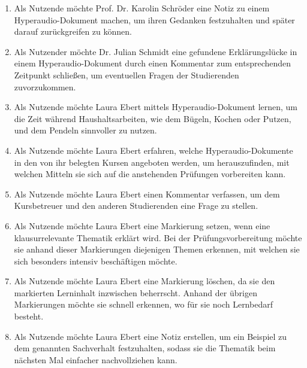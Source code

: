 \begin{enumerate}[label=US-\arabic*:,ref=US-\arabic*]
\item \label{US-Notiz-L} Als Nutzende möchte Prof. Dr. Karolin Schröder eine Notiz zu einem Hyperaudio-Dokument machen, um ihren Gedanken festzuhalten und später darauf zurückgreifen zu können.

\item \label{US-Kommentar-L} Als Nutzender möchte Dr. Julian Schmidt eine gefundene Erklärungslücke in einem Hyperaudio-Dokument durch einen Kommentar zum entsprechenden Zeitpunkt schließen, um eventuellen Fragen der Studierenden zuvorzukommen.


\item \label{US-Zeit} Als Nutzende möchte Laura Ebert mittels Hyperaudio-Dokument lernen, um die Zeit während Haushaltsarbeiten, wie dem Bügeln, Kochen oder Putzen, und dem Pendeln sinnvoller zu nutzen.

\item \label{US-Uebersicht-Kurse} Als Nutzende möchte Laura Ebert erfahren, welche Hyperaudio-Dokumente in den von ihr belegten Kursen angeboten werden, um herauszufinden, mit welchen Mitteln sie sich auf die anstehenden Prüfungen vorbereiten kann.

\item \label{US-Kommentar-S} Als Nutzende möchte Laura Ebert einen Kommentar verfassen, um dem Kursbetreuer und den anderen Studierenden eine Frage zu stellen.

\item \label{US-Markierung} Als Nutzende möchte Laura Ebert eine Markierung setzen, wenn eine klausurrelevante Thematik erklärt wird. Bei der Prüfungsvorbereitung möchte sie anhand dieser Markierungen diejenigen Themen erkennen, mit welchen sie sich besonders intensiv beschäftigen möchte.

\item \label{US-Markierung-Loeschen} Als Nutzende möchte Laura Ebert eine Markierung löschen, da sie den markierten Lerninhalt inzwischen beherrscht. Anhand der übrigen Markierungen möchte sie schnell erkennen, wo für sie noch Lernbedarf besteht.

\item \label{US-Notiz-S} Als Nutzende möchte Laura Ebert eine Notiz erstellen, um ein Beispiel zu dem genannten Sachverhalt festzuhalten, sodass sie die Thematik beim nächsten Mal einfacher nachvollziehen kann.


\end{enumerate}
